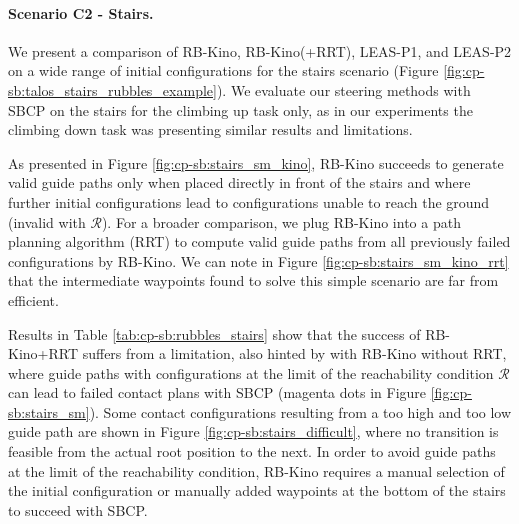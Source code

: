 
\paragraph{Scenario C2 - Stairs.\label{sec:cp-sb:par:stairs}}

We present a comparison of RB-Kino, RB-Kino(+RRT), LEAS-P1, and LEAS-P2 on a wide range of initial configurations for the stairs scenario (Figure \ref{fig:cp-sb:talos_stairs_rubbles_example}).
We evaluate our steering methods with SBCP on the stairs for the climbing up task only, as in our experiments the climbing down task was presenting similar results and limitations.

As presented in Figure \ref{fig:cp-sb:stairs_sm_kino}, RB-Kino succeeds to generate valid guide paths only when placed directly in front of the stairs and where further initial configurations lead to configurations unable to reach the ground (invalid with $\mathcal{R}$). 
For a broader comparison, we plug RB-Kino into a path planning algorithm (RRT) to compute valid guide paths from all previously failed configurations by RB-Kino.
We can note in Figure \ref{fig:cp-sb:stairs_sm_kino_rrt} that the intermediate waypoints found to solve this simple scenario are far from efficient.

Results in Table \ref{tab:cp-sb:rubbles_stairs} show that the success of RB-Kino+RRT suffers from a limitation, also hinted by with RB-Kino without RRT, where guide paths with configurations at the limit of the reachability condition $\mathcal{R}$ can lead to failed contact plans with SBCP (magenta dots in Figure \ref{fig:cp-sb:stairs_sm}).
Some contact configurations resulting from a too high and too low guide path are shown in Figure \ref{fig:cp-sb:stairs_difficult}, where no transition is feasible from the actual root position to the next.
In order to avoid guide paths at the limit of the reachability condition, RB-Kino requires a manual selection of the initial configuration or manually added waypoints at the bottom of the stairs to succeed with SBCP.

